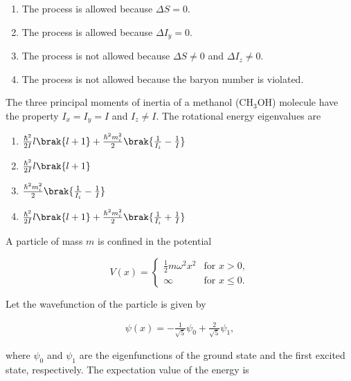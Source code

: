\begin{enumerate}
    \item The process is allowed because $\Delta S = 0$.
    \item The process is allowed because $\Delta I_{y} = 0$.
    \item The process is not allowed because $\Delta S \neq 0$ and $\Delta I_{z} \neq 0$.
    \item The process is not allowed because the baryon number is violated.
\end{enumerate}

\item The three principal moments of inertia of a methanol (CH$_3$OH) molecule have the property $I_x = I_y = I$ and $I_z \neq I$. The rotational energy eigenvalues are
\begin{multicols}{2}
\begin{enumerate}
    \item $\frac{\hbar^2}{2I}l\brak{l+1} + \frac{\hbar^2 m_i^2}{2}\brak{\frac{1}{I_i} - \frac{1}{I}}$\\
    \item $\frac{\hbar^2}{2I}l\brak{l+1}$
    \item $\frac{\hbar^2 m_i^2}{2}\brak{\frac{1}{I_i} - \frac{1}{I}}$\\
    \item $\frac{\hbar^2}{2I}l\brak{l+1} + \frac{\hbar^2 m_i^2}{2}\brak{\frac{1}{I_i} + \frac{1}{I}}$
\end{enumerate}
\end{multicols}
\item A particle of mass $m$ is confined in the potential 

\begin{equation*}
V(x) = \begin{cases}
\frac{1}{2}m\omega^2 x^2 & \text{for } x > 0, \\
\infty & \text{for } x \leq 0.
\end{cases}
\end{equation*}

Let the wavefunction of the particle is given by

\begin{align*}
\psi(x) = -\frac{1}{\sqrt{5}}\psi_0 + \frac{2}{\sqrt{5}}\psi_1,
\end{align*}

where $\psi_0$ and $\psi_1$ are the eigenfunctions of the ground state and the first excited state, respectively. The expectation value of the energy is


